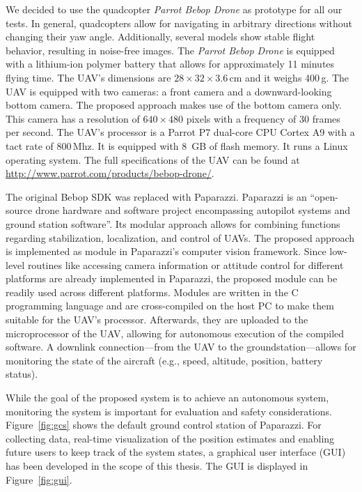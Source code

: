 \documentclass{report}
\begin{document}
We decided to use the quadcopter \emph{Parrot Bebop Drone} as
prototype for all our tests. In general, quadcopters allow for
navigating in arbitrary directions without changing their yaw
angle. Additionally, several models show stable flight behavior,
resulting in noise-free images. The \emph{Parrot Bebop Drone} is
equipped with a lithium-ion polymer battery that allows for
approximately 11 minutes flying time. The UAV's dimensions are
$28 \times 32 \times 3.6$\,cm and it weighs 400\,g. The UAV is
equipped with two cameras: a front camera and a downward-looking
bottom camera. The proposed approach makes use of the bottom camera
only. This camera has a resolution of $640 \times 480$ pixels with a
frequency of 30 frames per second. The UAV's processor is a Parrot P7
dual-core CPU Cortex A9 with a tact rate of 800\,Mhz. It is equipped
with 8~GB of flash memory. It runs a Linux operating system. The full
specifications of the UAV can be found at
\url{http://www.parrot.com/products/bebop-drone/}.

The original Bebop SDK was replaced with Paparazzi. Paparazzi is an
``open-source drone hardware and software project encompassing
autopilot systems and ground station software''. Its modular approach
allows for combining functions regarding stabilization, localization,
and control of UAVs.  The proposed approach is implemented as module
in Paparazzi's computer vision framework. Since low-level routines
like accessing camera information or attitude control for different
platforms are already implemented in Paparazzi, the proposed module
can be readily used across different platforms. Modules are written in
the C programming language and are cross-compiled on the host PC to
make them suitable for the UAV's processor. Afterwards, they are
uploaded to the microprocessor of the UAV, allowing for autonomous
execution of the compiled software. A downlink connection---from the
UAV to the groundstation---allows for monitoring the state of the
aircraft (e.g., speed, altitude, position, battery status).

While the goal of the proposed system is to achieve an autonomous
system, monitoring the system is important for evaluation and safety
considerations. Figure~\ref{fig:gcs} shows the default ground control
station of Paparazzi.  For collecting data, real-time visualization of
the position estimates and enabling future users to keep track of the
system states, a graphical user interface (GUI) has been developed in
the scope of this thesis. The GUI is displayed in
Figure~\ref{fig:gui}.
\end{document}
